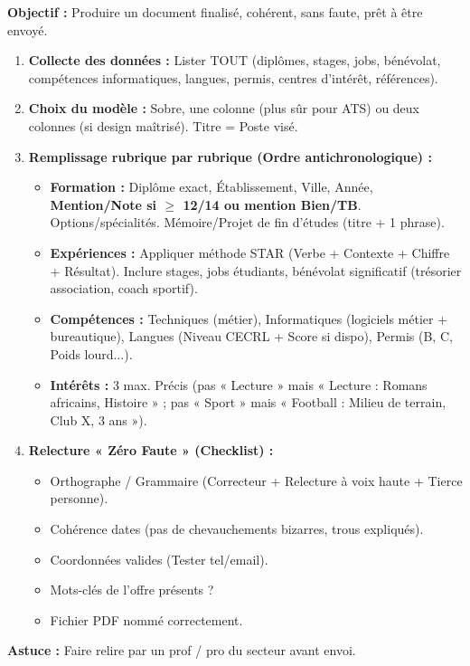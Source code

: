 \documentclass[11pt]{article}
\begin{document}
\begin{methode}
    \textbf{Objectif :} Produire un document finalisé, cohérent, sans faute, prêt à être envoyé.
    \begin{enumerate}
        \item \textbf{Collecte des données :} Lister TOUT (diplômes, stages, jobs, bénévolat, compétences informatiques, langues, permis, centres d'intérêt, références).
        \item \textbf{Choix du modèle :} Sobre, une colonne (plus sûr pour ATS) ou deux colonnes (si design maîtrisé). Titre = Poste visé.
        \item \textbf{Remplissage rubrique par rubrique (Ordre antichronologique) :}
            \begin{itemize}
                \item \textbf{Formation :} Diplôme exact, Établissement, Ville, Année, \textbf{Mention/Note si $\ge$ 12/14 ou mention Bien/TB}. Options/spécialités. Mémoire/Projet de fin d'études (titre + 1 phrase).
                \item \textbf{Expériences :} Appliquer méthode STAR (Verbe + Contexte + Chiffre + Résultat). Inclure stages, jobs étudiants, bénévolat significatif (trésorier association, coach sportif).
                \item \textbf{Compétences :} Techniques (métier), Informatiques (logiciels métier + bureautique), Langues (Niveau CECRL + Score si dispo), Permis (B, C, Poids lourd...).
                \item \textbf{Intérêts :} 3 max. Précis (pas « Lecture » mais « Lecture : Romans africains, Histoire » ; pas « Sport » mais « Football : Milieu de terrain, Club X, 3 ans »).
            \end{itemize}
        \item \textbf{Relecture « Zéro Faute » (Checklist) :}
            \begin{itemize}
                \item Orthographe / Grammaire (Correcteur + Relecture à voix haute + Tierce personne).
                \item Cohérence dates (pas de chevauchements bizarres, trous expliqués).
                \item Coordonnées valides (Tester tel/email).
                \item Mots-clés de l'offre présents ?
                \item Fichier PDF nommé correctement.
            \end{itemize}
    \end{enumerate}
    \textbf{Astuce :} Faire relire par un prof / pro du secteur avant envoi.
\end{methode}
\end{document}
